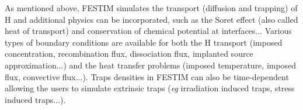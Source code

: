 




As mentioned above, FESTIM simulates the transport (diffusion and trapping) of H and additional physics can be incorporated, such as the Soret effect (also called heat of transport) and conservation of chemical potential at interfaces...
Various types of boundary conditions are available for both the H transport (imposed concentration, recombination flux, dissociation flux, implanted source approximation...) and the heat transfer problems (imposed temperature, imposed flux, convective flux...).
Traps densities in FESTIM can also be time-dependent allowing the users to simulate extrinsic traps (\textit{eg} irradiation induced traps, stress induced traps...).

